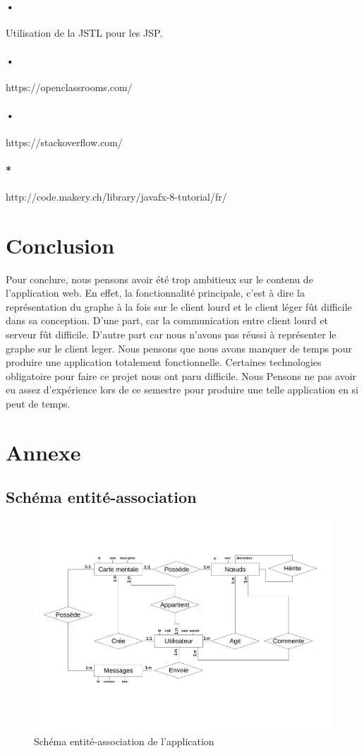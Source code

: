 \documentclass[11pt,a4paper]{article}
\begin{document}
\paragraph{•} Utilisation de la JSTL pour les JSP.
\paragraph{•} https://openclassrooms.com/
\paragraph{•} https://stackoverflow.com/
\paragraph{*} http://code.makery.ch/library/javafx-8-tutorial/fr/

\section{Conclusion}
Pour conclure, nous pensons avoir été trop ambitieux sur le contenu de
l'application web. En effet, la fonctionnalité principale, c'est à
dire la représentation du graphe à la fois sur le client lourd et le client
léger fût difficile dans sa conception. D'une part, car la communication
entre client lourd et serveur fût difficile. D'autre part car nous
n'avons pas réussi à représenter le graphe sur le client leger. Nous
pensons que nous avons manquer de temps pour produire une application
totalement fonctionnelle. Certaines technologies obligatoire pour faire
ce projet nous ont paru difficile. Nous Pensons ne pas avoir eu assez
d'expérience lors de ce semestre pour produire une telle application
en si peut de temps.  


\newpage
\section{Annexe}
\subsection{Schéma entité-association}
\begin{figure}[!h]
\includegraphics[angle=270, scale=0.6]{Image/Schema_entite_association.pdf}
\caption{Schéma entité-association de l'application}
\end{figure}
\newpage
\end{document}
